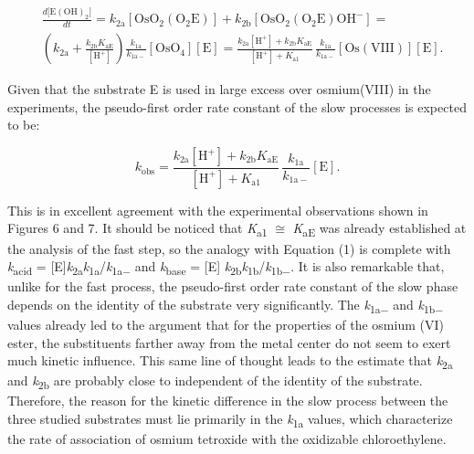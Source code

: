 \documentclass{article}
\begin{document}
\begin{equation}
\begin{split}
&\frac{d\bigl[\mathrm{E(OH)_2}\bigr]}{dt} = k_{\mathrm{2a}}[\mathrm{OsO_2(O_2E)}] + k_{\mathrm{2b}}[\mathrm{OsO_2(O_2E)OH^-}] =\\
&\left(k_{\mathrm{2a}} + \frac{k_{\mathrm{2b}}K_{\mathrm{aE}}}{[\mathrm{H}^+]}\right)\frac{k_{\mathrm{1a}}}{k_{\mathrm{1a-}}}[\mathrm{OsO_4}][\mathrm{E}] = \frac{k_{\mathrm{2a}}[\mathrm{H}^+] + k_{\mathrm{2b}}K_{\mathrm{aE}}}{[\mathrm{H}^+] + K_{\mathrm{a1}}}\,\frac{k_{\mathrm{1a}}}{k_{\mathrm{1a-}}}[\mathrm{Os(VIII)}][\mathrm{E}].
\end{split} \tag{18}
\end{equation}

Given that the substrate E is used in large excess over osmium(VIII) in the experiments, the pseudo-first order rate constant of the slow processes is expected to be:

\begin{equation}
k_{\mathrm{obs}} = \frac{k_{\mathrm{2a}}[\mathrm{H}^+] + k_{\mathrm{2b}}K_{\mathrm{aE}}}{[\mathrm{H}^+] + K_{\mathrm{a1}}}\,\frac{k_{\mathrm{1a}}}{k_{\mathrm{1a-}}}[\mathrm{E}]. \tag{19}
\end{equation}

This is in excellent agreement with the experimental observations shown in Figures 6 and 7. It should be noticed that \emph{K}\textsubscript{a1} $\cong$ \emph{K}\textsubscript{aE} was already established at the analysis of the fast step, so the analogy with Equation (1) is complete with \emph{k}\textsubscript{acid} = [E]\emph{k}\textsubscript{2a}\emph{k}\textsubscript{1a}/\emph{k}\textsubscript{1a−} and \emph{k}\textsubscript{base} = [E] \emph{k}\textsubscript{2b}\emph{k}\textsubscript{1b}/\emph{k}\textsubscript{1b−}. It is also remarkable that, unlike for the fast process, the pseudo-first order rate constant of the slow phase depends on the identity of the substrate very significantly. The \emph{k}\textsubscript{1a−} and \emph{k}\textsubscript{1b−} values already led to the argument that for the properties of the osmium (VI) ester, the substituents farther away from the metal center do not seem to exert much kinetic influence. This same line of thought leads to the estimate that \emph{k}\textsubscript{2a} and \emph{k}\textsubscript{2b} are probably close to independent of the identity of the substrate. Therefore, the reason for the kinetic difference in the slow process between the three studied substrates must lie primarily in the \emph{k}\textsubscript{1a} values, which characterize the rate of association of osmium tetroxide with the oxidizable chloroethylene.
\end{document}
